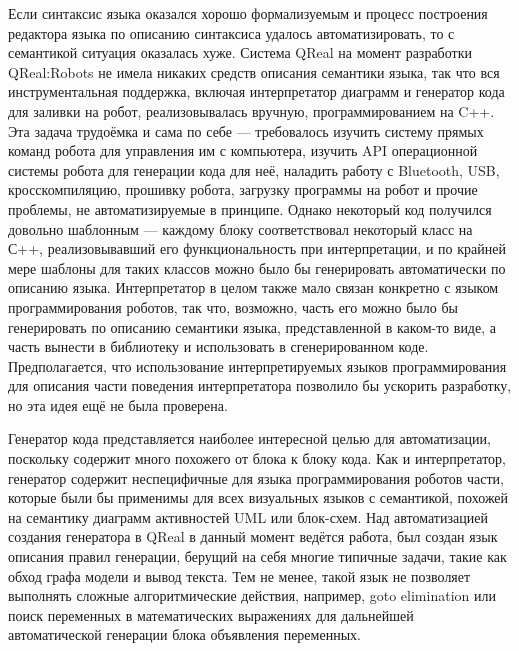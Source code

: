 \documentclass[a4paper]{article}
\begin{document}
{Если синтаксис языка оказался хорошо формализуемым и процесс построения редактора языка по описанию синтаксиса удалось автоматизировать, то с семантикой ситуация оказалась хуже. Система QReal на момент разработки QReal:Robots не имела никаких средств описания семантики языка, так что вся инструментальная поддержка, включая интерпретатор диаграмм и генератор кода для заливки на робот, реализовывалась вручную, программированием на C++. Эта задача трудоёмка и сама по себе --- требовалось изучить систему прямых команд робота для управления им с компьютера, изучить API операционной системы робота для генерации кода для неё, наладить работу с Bluetooth, USB, кросскомпиляцию, прошивку робота, загрузку программы на робот и прочие проблемы, не автоматизируемые в принципе. Однако  некоторый код получился довольно шаблонным --- каждому блоку соответствовал некоторый класс на С++, реализовывавший его функциональность при интерпретации, и по крайней мере шаблоны для таких классов можно было бы генерировать автоматически по описанию языка. Интерпретатор в целом также мало связан конкретно с языком программирования роботов, так что, возможно, часть его можно было бы генерировать по описанию семантики языка, представленной в каком-то виде, а часть вынести в библиотеку и использовать в сгенерированном коде. Предполагается, что использование интерпретируемых языков программирования для описания части поведения интерпретатора позволило бы ускорить разработку, но эта идея ещё не была проверена.

Генератор кода представляется наиболее интересной целью для автоматизации, поскольку содержит много похожего от блока к блоку кода. Как и интерпретатор, генератор содержит неспецифичные для языка программирования роботов части, которые были бы применимы для всех визуальных языков с семантикой, похожей на семантику диаграмм активностей UML или блок-схем. Над автоматизацией создания генератора в QReal в данный момент ведётся работа, был создан язык описания правил генерации, берущий на себя многие типичные задачи, такие как обход графа модели и вывод текста. Тем не менее, такой язык не позволяет выполнять сложные алгоритмические действия, например, goto elimination или поиск переменных в математических выражениях для дальнейшей автоматической генерации блока объявления переменных.

}
\end{document}
